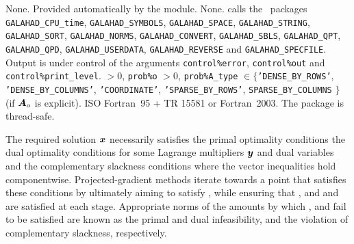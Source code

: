 \documentclass{galahad}
\newcommand{\packagename}{SLLS}
\begin{document}

\galgeneral

\galcommon None.
\galworkspace Provided automatically by the module.
\galroutines None.
\galmodules {\tt \packagename\_solve} calls the \galahad\ packages
{\tt GALAHAD\_CPU\_time},
{\tt GALAHAD\_SY\-M\-BOLS}, \newline
{\tt GALAHAD\_SPACE},
{\tt GALAHAD\_STRING},
{\tt GALAHAD\_SORT},
{\tt GALAHAD\_NORMS},
{\tt GALAHAD\_CONVERT},
{\tt GALAHAD\_SBLS}, \newline
{\tt GALAHAD\_QPT},
{\tt GALAHAD\_QPD},
{\tt GALAHAD\_USERDATA},
{\tt GALAHAD\_REVERSE} and
{\tt GALAHAD\_SPECFILE}.
\galio Output is under control of the arguments
 {\tt control\%error}, {\tt control\%out} and {\tt control\%print\_level}.
 $> 0$, {\tt prob\%o} $> 0$,
{\tt prob\%A\_type} $\in \{${\tt 'DENSE\_BY\_ROWS'}, {\tt 'DENSE\_BY\_COLUMNS'},
 {\tt 'COORDINATE'}, {\tt 'SPARSE\_BY\_\-ROWS'},
 {\tt SPARSE\_BY\_COLUMNS} $\}$
(if ${\bm{A}}_o$ is explicit).
\galportability ISO Fortran~95 + TR 15581 or Fortran~2003.
The package is thread-safe.


\galmethod
The required solution ${\bm{x}}$ necessarily satisfies
the primal optimality conditions
the dual optimality conditions
for some Lagrange multipliers ${\bm{y}}$ and dual variables
and the complementary slackness conditions
where the vector inequalities hold componentwise.
Projected-gradient methods iterate towards a point
that satisfies these conditions by ultimately aiming to satisfy
, while ensuring that
, and  and  are satisfied at each stage.
Appropriate norms of the amounts by
which ,  and  fail to be satisfied are known as the
primal and dual infeasibility, and the violation of complementary slackness,
respectively.
\end{document}

